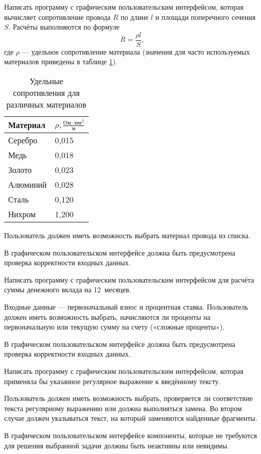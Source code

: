 \task Написать программу с графическим пользовательским интерфейсом,
которая вычисляет сопротивление провода $R$ по длине $l$ и площади
поперечного сечения $S$. Расчёты выполняются по формуле
\[
R = \frac{\rho l}{S},
\]
где $\rho$ — удельное сопротивление материала (значения для часто
используемых материалов приведены в таблице \ref{table:resistance}).

\begin{table}
  \centering
  \begin{tabular}{l|l}
    Материал&$\rho, \frac{\textrm{Ом}\cdot\textrm{мм}^2}{\textrm{м}}$\\
    \hline
    Серебро  & 0{,}015 \\
    Медь     & 0{,}018 \\
    Золото   & 0{,}023 \\
    Алюминий & 0{,}028 \\
    Сталь    & 0{,}120 \\
    Нихром   & 1{,}200
  \end{tabular}
  \caption{Удельные сопротивления для различных материалов}
  \label{table:resistance}
\end{table}

Пользователь должен иметь возможность выбрать материал провода из списка.

В графическом пользовательском интерфейсе должна быть предусмотрена
проверка корректности входных данных.

\task Написать программу с графическим пользовательским интерфейсом
для расчёта суммы денежного вклада на 12~месяцев.

Входные данные — первоначальный взнос и процентная
ставка. Пользователь должен иметь возможность выбрать, начисляются ли
проценты на первоначальную или текущую сумму на счету («сложные
проценты»).

В графическом пользовательском интерфейсе должна быть предусмотрена
проверка корректности входных данных.

\task Написать программу с графическим пользовательским интерфейсом,
которая применяла бы указанное регулярное выражение к введённому
тексту.

Пользователь должен иметь возможность выбрать, проверяется ли
соответствие текста регулярному выражению или должна выполняться
замена. Во втором случае должен указываться текст, на который
заменяются найденные фрагменты.

В графическом пользовательском интерфейсе компоненты, которые не
требуются для решения выбранной задачи должны быть неактивны или
невидимы.


